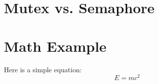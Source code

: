 \documentclass[main.tex]{subfiles}
\begin{document}
\section{Mutex vs. Semaphore}

\section{Math Example}
Here is a simple equation:
\begin{equation}
   E = mc^2
\end{equation}
\end{document}
